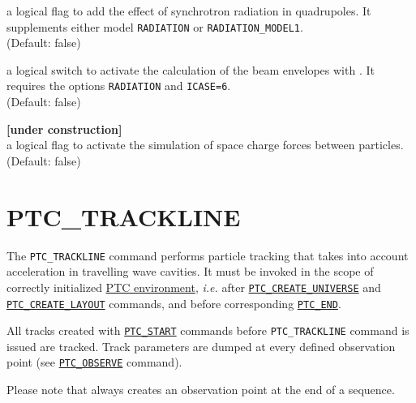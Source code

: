 \begin{madlist}
    a logical flag to add the effect of
   synchrotron radiation in quadrupoles. It supplements either model
   \texttt{RADIATION} or \texttt{RADIATION\_MODEL1}. \\
   (Default: false)

    a logical switch to activate the calculation
   of the beam envelopes with \ptc. It requires the options
   \texttt{RADIATION} and \texttt{ICASE=6}.\\
   (Default: false)

    \textbf{[under construction]}\\
     a logical flag to activate the simulation of space charge forces
     between particles. \\ (Default: false)  
\end{madlist}


\section{PTC\_TRACKLINE}
\label{sec:ptc-trackline}

The \texttt{PTC\_TRACKLINE} command performs particle tracking that takes
into account acceleration in travelling wave cavities. 
It must be invoked in the scope of correctly initialized
\hyperref[chap:ptc-setup]{PTC environment}, \textsl{i.e.} after
\hyperref[sec:ptc-create-universe]{\texttt{PTC\_CREATE\_UNIVERSE}} 
and \hyperref[sec:ptc-create-layout]{\texttt{PTC\_CREATE\_LAYOUT}} commands, and before
corresponding \hyperref[sec:ptc-end]{\texttt{PTC\_END}}. 

All tracks created with \hyperref[sec:ptc-start]{\texttt{PTC\_START}}
commands before \texttt{PTC\_TRACKLINE} command is issued are 
tracked. Track parameters are dumped at every defined observation point
(see \hyperref[sec:ptc-observe]{\texttt{PTC\_OBSERVE}} command). 

Please note that \madx always creates an observation point at the end of a
sequence.


